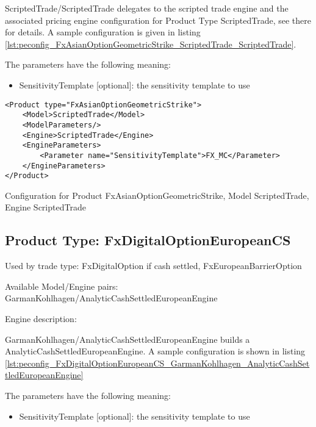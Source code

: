 ScriptedTrade/ScriptedTrade delegates to the scripted trade engine and the associated pricing engine configuration for
Product Type ScriptedTrade, see there for details. A sample configuration is given in listing
\ref{lst:peconfig_FxAsianOptionGeometricStrike_ScriptedTrade_ScriptedTrade}.

The parameters have the following meaning:

\begin{itemize}
\item SensitivityTemplate [optional]: the sensitivity template to use 
\end{itemize}

\begin{longlisting}
\begin{verbatim}
<Product type="FxAsianOptionGeometricStrike">
    <Model>ScriptedTrade</Model>
    <ModelParameters/>
    <Engine>ScriptedTrade</Engine>
    <EngineParameters>
        <Parameter name="SensitivityTemplate">FX_MC</Parameter>
    </EngineParameters>
</Product>
\end{verbatim}
\caption{Configuration for Product FxAsianOptionGeometricStrike, Model ScriptedTrade, Engine ScriptedTrade}
\label{lst:peconfig_FxAsianOptionGeometricStrike_ScriptedTrade_ScriptedTrade}
\end{longlisting}

\subsection{Product Type: FxDigitalOptionEuropeanCS}

Used by trade type: FxDigitalOption if cash settled, FxEuropeanBarrierOption

Available Model/Engine pairs: GarmanKohlhagen/AnalyticCashSettledEuropeanEngine

Engine description:

GarmanKohlhagen/AnalyticCashSettledEuropeanEngine builds a AnalyticCashSettledEuropeanEngine. A sample configuration is
shown in listing \ref{lst:peconfig_FxDigitalOptionEuropeanCS_GarmanKohlhagen_AnalyticCashSettledEuropeanEngine}

The parameters have the following meaning:

\begin{itemize}
\item SensitivityTemplate [optional]: the sensitivity template to use 
\end{itemize}

